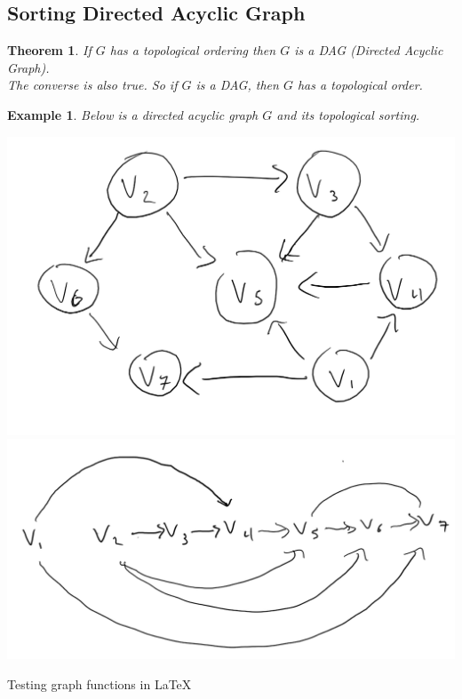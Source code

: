 \documentclass{report}
\newtheorem*{ex}{Example}
\newtheorem*{thrm}{Theorem}
\begin{document}
\subsection{Sorting Directed Acyclic Graph}
\begin{thrm}
If $G$ has a topological ordering then $G$ is a DAG (Directed Acyclic Graph).\\
The converse is also true. So if $G$ is a DAG, then $G$ has a topological order.
\end{thrm}
\begin{ex}
Below is a directed acyclic graph $G$ and its topological sorting.
\begin{center}
\includegraphics[scale=0.5]{TopSortingGraph1.png}\\
\includegraphics[scale=0.5]{TopologicalSorting1.png}
\end{center}
\end{ex}
Testing graph functions in \LaTeX
\end{document}
